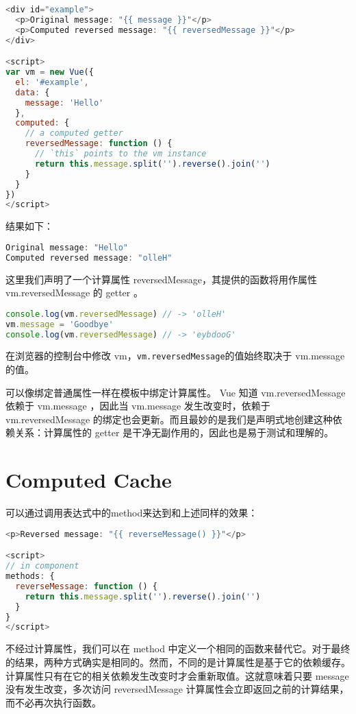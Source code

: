 \begin{lstlisting}[language=JavaScript]
<div id="example">
  <p>Original message: "{{ message }}"</p>
  <p>Computed reversed message: "{{ reversedMessage }}"</p>
</div>

<script>
var vm = new Vue({
  el: '#example',
  data: {
    message: 'Hello'
  },
  computed: {
    // a computed getter
    reversedMessage: function () {
      // `this` points to the vm instance
      return this.message.split('').reverse().join('')
    }
  }
})
</script>
\end{lstlisting}

结果如下：


\begin{lstlisting}[language=JavaScript]
Original message: "Hello"
Computed reversed message: "olleH"
\end{lstlisting}

这里我们声明了一个计算属性 reversedMessage，其提供的函数将用作属性 vm.reversedMessage 的 getter 。


\begin{lstlisting}[language=JavaScript]
console.log(vm.reversedMessage) // -> 'olleH'
vm.message = 'Goodbye'
console.log(vm.reversedMessage) // -> 'eybdooG'
\end{lstlisting}

在浏览器的控制台中修改 vm，\texttt{vm.reversedMessage}的值始终取决于 vm.message 的值。


可以像绑定普通属性一样在模板中绑定计算属性。 Vue 知道 vm.reversedMessage 依赖于 vm.message ，因此当 vm.message 发生改变时，依赖于 vm.reversedMessage 的绑定也会更新。而且最妙的是我们是声明式地创建这种依赖关系：计算属性的 getter 是干净无副作用的，因此也是易于测试和理解的。


\section{Computed Cache}

可以通过调用表达式中的method来达到和上述同样的效果：


\begin{lstlisting}[language=JavaScript]
<p>Reversed message: "{{ reverseMessage() }}"</p>

<script>
// in component
methods: {
  reverseMessage: function () {
    return this.message.split('').reverse().join('')
  }
}
</script>
\end{lstlisting}

不经过计算属性，我们可以在 method 中定义一个相同的函数来替代它。对于最终的结果，两种方式确实是相同的。然而，不同的是计算属性是基于它的依赖缓存。计算属性只有在它的相关依赖发生改变时才会重新取值。这就意味着只要 message 没有发生改变，多次访问 reversedMessage 计算属性会立即返回之前的计算结果，而不必再次执行函数。


